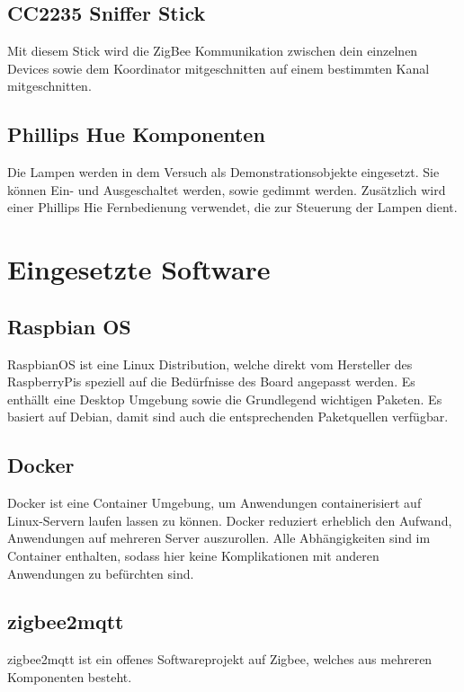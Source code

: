 \subsection{CC2235 Sniffer Stick}

Mit diesem Stick wird die ZigBee Kommunikation zwischen dein einzelnen Devices sowie dem Koordinator mitgeschnitten auf einem bestimmten Kanal mitgeschnitten.

\subsection{Phillips Hue Komponenten}

Die Lampen werden in dem Versuch als Demonstrationsobjekte eingesetzt. Sie können Ein- und Ausgeschaltet werden, sowie gedimmt werden. Zusätzlich wird einer
Phillips Hie Fernbedienung verwendet, die zur Steuerung der Lampen dient.

\section{Eingesetzte Software}

\subsection{Raspbian OS}

RaspbianOS ist eine Linux Distribution, welche direkt vom Hersteller des RaspberryPis speziell auf die Bedürfnisse des Board angepasst werden. Es enthällt eine
Desktop Umgebung sowie die Grundlegend wichtigen Paketen. Es basiert auf Debian, damit sind auch die entsprechenden Paketquellen verfügbar.

\subsection{Docker}

Docker ist eine Container Umgebung, um Anwendungen containerisiert auf Linux-Servern laufen lassen zu können. Docker reduziert erheblich den Aufwand, 
Anwendungen auf mehreren Server auszurollen. Alle Abhängigkeiten sind im Container enthalten, sodass hier keine Komplikationen mit anderen Anwendungen
zu befürchten sind.

\subsection{zigbee2mqtt}

zigbee2mqtt ist ein offenes Softwareprojekt auf Zigbee, welches aus mehreren Komponenten besteht.

